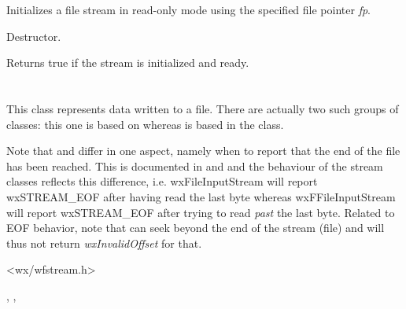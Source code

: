 
Initializes a file stream in read-only mode using the specified file pointer {\it fp}.

\label{wxffileinputstreamdtor}


Destructor.

\label{wxffileinputstreamok}


Returns true if the stream is initialized and ready.

\section{}\label{wxffileoutputstream}

This class represents data written to a file. There are actually
two such groups of classes: this one is based on  
whereas  is based in
the  class.

Note that  and  differ
in one aspect, namely when to report that the end of the file has been
reached. This is documented in  and 
 and the behaviour of the stream
classes reflects this difference, i.e. wxFileInputStream will report
wxSTREAM\_EOF after having read the last byte whereas wxFFileInputStream
will report wxSTREAM\_EOF after trying to read {\it past} the last byte.
Related to EOF behavior, note that  
can seek beyond the end of the stream (file) and will thus not return 
{\it wxInvalidOffset} for that.




<wx/wfstream.h>


, , 

